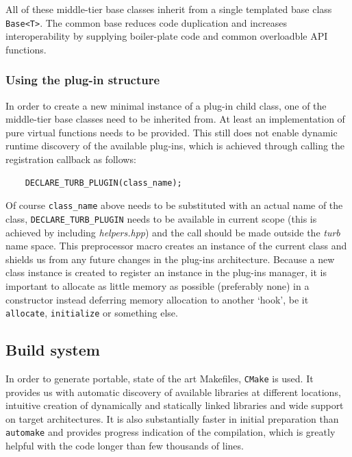 \documentclass[11pt,a4paper]{article}
\begin{document}
\begin{appendices}
    All of these middle-tier base classes inherit from a single templated base class \texttt{Base<T>}.
    The common base reduces code duplication and increases interoperability by supplying boiler-plate code and common overloadble API functions.
    
    \subsubsection{Using the plug-in structure}
    In order to create a new minimal instance of a plug-in child class, one of the middle-tier base classes need to be inherited from.
    At least an implementation of pure virtual functions needs to be provided.
    This still does not enable dynamic runtime discovery of the available plug-ins, which is achieved through calling the registration callback as follows:

    \begin{verbatim}
    DECLARE_TURB_PLUGIN(class_name);
    \end{verbatim}

    Of course \texttt{class\_name} above needs to be substituted with an actual name of the class, \texttt{DECLARE\_TURB\_PLUGIN} needs to be available in current scope (this is achieved by including \textit{helpers.hpp}) and the call should be made outside the \textit{turb} name space.
    This preprocessor macro creates an instance of the current class and shields us from any future changes in the plug-ins architecture.
    Because a new class instance is created to register an instance in the plug-ins manager, it is important to allocate as little memory as possible (preferably none) in a constructor instead deferring memory allocation to another `hook', be it \texttt{allocate}, \texttt{initialize} or something else.

    \subsection{Build system}
    In order to generate portable, state of the art Makefiles, \texttt{CMake} is used.
    It provides us with automatic discovery of available libraries at different locations, intuitive creation of dynamically and statically linked libraries and wide support on target architectures.
    It is also substantially faster in initial preparation than \texttt{automake} and provides progress indication of the compilation, which is greatly helpful with the code longer than few thousands of lines.


\end{appendices}
\end{document}
